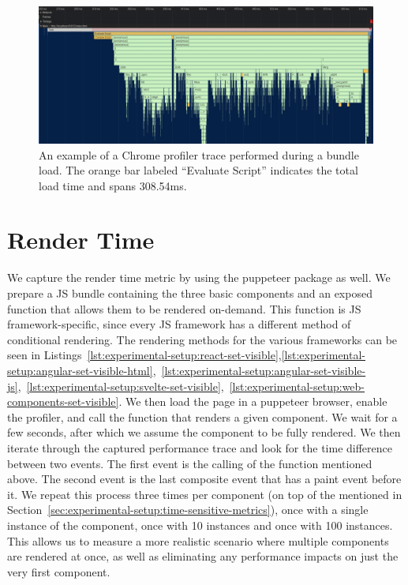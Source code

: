 \begin{figure}[h]
	\includegraphics[width=\columnwidth]{figures/experimental-setup/load-time.png}
	\caption{An example of a Chrome profiler trace performed during a bundle load. The orange bar labeled ``Evaluate Script'' indicates the total load time and spans 308.54ms.}
	\label{fig:experimental-setup:load-time}
	\centering
\end{figure}

\section{Render Time}
We capture the render time metric by using the puppeteer package as well. We prepare a JS bundle containing the three basic components and an exposed function that allows them to be rendered on-demand. This function is JS framework-specific, since every JS framework has a different method of conditional rendering. The rendering methods for the various frameworks can be seen in Listings~\ref{lst:experimental-setup:react-set-visible},\ref{lst:experimental-setup:angular-set-visible-html},~\ref{lst:experimental-setup:angular-set-visible-js},~\ref{lst:experimental-setup:svelte-set-visible},~\ref{lst:experimental-setup:web-components-set-visible}. We then load the page in a puppeteer browser, enable the profiler, and call the function that renders a given component. We wait for a few seconds, after which we assume the component to be fully rendered. We then iterate through the captured performance trace and look for the time difference between two events. The first event is the calling of the function mentioned above. The second event is the last composite event that has a paint event before it. We repeat this process three times per component (on top of the \numMeasures{} mentioned in Section~\ref{sec:experimental-setup:time-sensitive-metrics}), once with a single instance of the component, once with 10 instances and once with 100 instances. This allows us to measure a more realistic scenario where multiple components are rendered at once, as well as eliminating any performance impacts on just the very first component.

